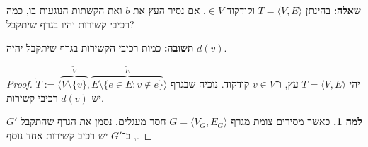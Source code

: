 \documentclass[]{article}
\newcommand\ra    {\rangle}
\newcommand\la    {\langle}
\newcommand\tl    {\tilde}
\begin{document}
	\section{}
	\textbf{שאלה: }בהינתן $T = \la V, E \ra$ וקודקוד $ \in V$. אם נסיר העץ את $b$ ואת הקשתות הנוגעות בו, כמה רכיבי קשירות יהיו בגרף שיתקבל? 
	
	\textbf{תשובה: }כמות רכיבי הקשירות בגרף שיתקבל יהיה $d(v)$. 
	
	\begin{proof}
		יהי $T = \la V, E \ra$ עץ, ו־$v \in V$ קודקוד. נוכיח שבגרף $\tl T := \la \overbrace{V \setminus \{v\}}^{\tl V}, \overbrace{E \setminus \{e \in E \colon v \notin e\}}^{\tl E} \ra$ יש $d(v)$ רכיבי קשירות. 
		
		\textbf{למה 1. }כאשר מסירים צומת מגרף $G = \la V_G, E_G \ra$ חסר מעגלים, נסמן את הגרף שהתקבל $G'$, ב־$G'$ יש רכיב קשירות אחד נוסף.
		

\end{proof}
\end{document}

